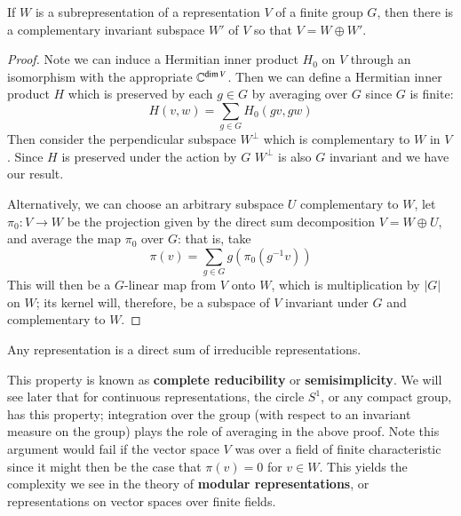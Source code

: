 \begin{proposition}
    If $W$ is a subrepresentation of a representation $V$ of a finite group $G$, then there is a complementary invariant subspace $W'$ of $V$ so that $V = W\oplus W'$.
\end{proposition}
\begin{proof}
    Note we can induce a Hermitian inner product $H_0$ on $V$ through an isomorphism with the appropriate $\mathbb C^{\dim V}$. Then we can define a Hermitian inner product $H$ which is preserved by each $g \in G$ by averaging over $G$ since $G$ is finite: \begin{equation*}
        H(v,w) = \sum_{g \in G}H_0(gv,gw)
    \end{equation*}
    Then consider the perpendicular subspace $W^{\perp}$ which is complementary to $W$ in $V$. Since $H$ is preserved under the action by $G$ $W^{\perp}$ is also $G$ invariant and we have our result.

    Alternatively, we can choose an arbitrary subspace $U$ complementary to $W$, let $\pi_0:V\rightarrow W$ be the projection given by the direct sum decomposition $V = W\oplus U$, and average the map $\pi_0$ over $G$: that is, take \begin{equation*}
        \pi(v) = \sum_{g \in G}g(\pi_0(g^{-1}v))
    \end{equation*}
    This will then be a $G$-linear map from $V$ onto $W$, which is multiplication by $|G|$ on $W$; its kernel will, therefore, be a subspace of $V$ invariant under $G$ and complementary to $W$. 
\end{proof}

\begin{corollary}
    Any representation is a direct sum of irreducible representations.
\end{corollary}

This property is known as \textbf{complete reducibility} or \textbf{semisimplicity}. We will see later that for continuous representations, the circle $S^1$, or any compact group, has this property; integration over the group (with respect to an invariant measure on the group) plays the role of averaging in the above proof. Note this argument would fail if the vector space $V$ was over a field of finite characteristic since it might then be the case that $\pi(v) = 0$ for $v \in W$. This yields the complexity we see in the theory of \textbf{modular representations}, or representations on vector spaces over finite fields.

